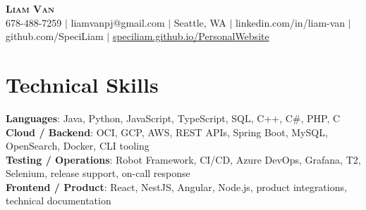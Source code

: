 \documentclass[letterpaper,11pt]{article}
\begin{document}

%
\begin{center}
    \textbf{\Huge \scshape Liam Van} \\ \vspace{1pt}
    \small 678-488-7259 $|$ \small {liamvanpj@gmail.com} $|$ Seattle, WA
 {{$|$ linkedin.com/in/liam-van} {$|$ github.com/SpeciLiam} {$|$ \href{https://speciliam.github.io/PersonalWebsite}{speciliam.github.io/PersonalWebsite}}}

\end{center}

\section{Technical Skills}
 \begin{itemize}[leftmargin=0.15in, label={}]
    \small{\item{
     \textbf{Languages}{: Java, Python, JavaScript, TypeScript, SQL, C++, C\#, PHP, C} \\
     \textbf{Cloud / Backend}{: OCI, GCP, AWS, REST APIs, Spring Boot, MySQL, OpenSearch, Docker, CLI tooling} \\
     \textbf{Testing / Operations}{: Robot Framework, CI/CD, Azure DevOps, Grafana, T2, Selenium, release support, on-call response} \\
     \textbf{Frontend / Product}{: React, NestJS, Angular, Node.js, product integrations, technical documentation} \\
    }}
 \end{itemize}
%
\end{document}
